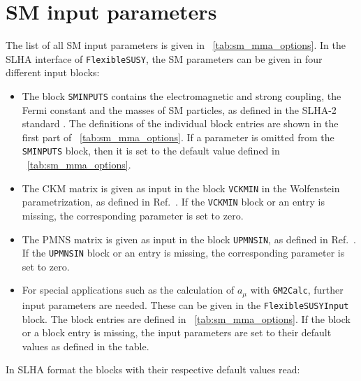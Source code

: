 \documentclass[final,3p,11pt,pdflatex]{elsarticle}
\makeatletter
\newcommand{\fs}{\texttt{FlexibleSUSY}\@\xspace}
\newcommand{\GMTCalc}{\texttt{GM2Calc}\@\xspace}
\newcommand{\amu}{\ensuremath{a_\mu}\xspace}
\newcommand{\tabref}[1]{\tablename~\ref{#1}}
\makeatother
\begin{document}
\appendix
\renewcommand*{\thesection}{\Alph{section}}

\section{SM input parameters}
\label{app:sm_input_parameters}
%
The list of all SM input parameters is given
in \tabref{tab:sm_mma_options}.  In the SLHA interface of \fs, the
SM parameters can be given in four different input blocks:
%
\begin{itemize}
\item The block \texttt{SMINPUTS} contains the electromagnetic and
  strong coupling, the Fermi constant and the masses of SM
  particles, as defined in the SLHA-2 standard \cite{Allanach:2008qq}.
  The definitions of the individual block entries are shown in the
  first part of \tabref{tab:sm_mma_options}.  If a parameter is
  omitted from the \texttt{SMINPUTS} block, then it is set to the
  default value defined in \tabref{tab:sm_mma_options}.
\item The CKM matrix is given as input in the block \texttt{VCKMIN} in
  the Wolfenstein parametrization, as defined in
  Ref.~\cite{Allanach:2008qq}.  If the \texttt{VCKMIN} block or an entry is
  missing, the corresponding parameter is set to zero.
\item The PMNS matrix is given as input in the block
  \texttt{UPMNSIN}, as defined in Ref.~\cite{Allanach:2008qq}.  If the
  \texttt{UPMNSIN} block or an entry is missing, the corresponding
  parameter is set to zero.
\item For special applications such as the calculation of
  $\amu$ with \GMTCalc, further input parameters are
  needed.  These can be given in the \texttt{FlexibleSUSYInput} block.
  The block entries are defined in \tabref{tab:sm_mma_options}.  If
  the block or a block entry is missing, the input parameters are set
  to their default values as defined in the table.
\end{itemize}
%
In SLHA format the blocks with their respective default values read:
%
\end{document}

